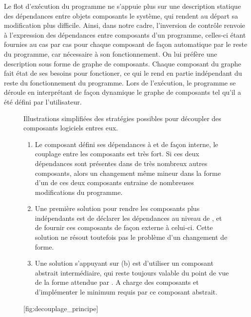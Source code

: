 Le flot d'exécution du programme ne s'appuie plus sur une description statique des dépendances entre objets composants le système, qui rendent au départ sa modification plus difficile. Ainsi, dans notre cadre, l'inversion de contrôle renvoie à l'expression des dépendances entre composants d'un programme, celles-ci étant fournies au cas par cas pour chaque composant de façon automatique par le reste du programme, car nécessaire à son fonctionnement. On lui préfère une description sous forme de graphe de composants. Chaque composant du graphe fait état de ses besoins pour fonctioner, ce qui le rend en partie indépendant du reste du fonctionnement du programme. Lors de l'exécution, le programme se déroule en interprétant de façon dynamique le graphe de composants tel qu'il a été défini par l'utilisateur.

\begin{figure}[!htbp]
  \begin{sidecaption}[fortoc]{Illustrations simplifiées des stratégies possibles pour découpler des composants logiciels entres eux. \parbox{\marginparwidth}{
	\begin{enumerate}[label=(\alph*),labelindent=\parindent,leftmargin=*]
	        \item Le composant  défini ses dépendances à  et  de façon interne, le couplage entre les composants est très fort. Si ces deux dépendances sont présentes dans de très nombreux autres composants, alors un changement même mineur dans la forme d'un de ces deux composants entraine de nombreuses modifications du programme.
	        \item Une première solution pour rendre les composants plus indépendants est de déclarer les dépendances au niveau de , et de fournir ces composants de façon externe à celui-ci. Cette solution ne résout toutefois pas le problème d'un changement de forme.
	        \item Une solution s'appuyant sur (b) est d'utiliser un composant abstrait intermédiaire, qui reste toujours valable du point de vue de la forme attendue par . A charge des composants  et  d'implémenter le minimum requis par ce composant abstrait.
	\end{enumerate}}}[fig:decouplage_principe]
  \centering
  \qquad
 \end{sidecaption}
\end{figure}

